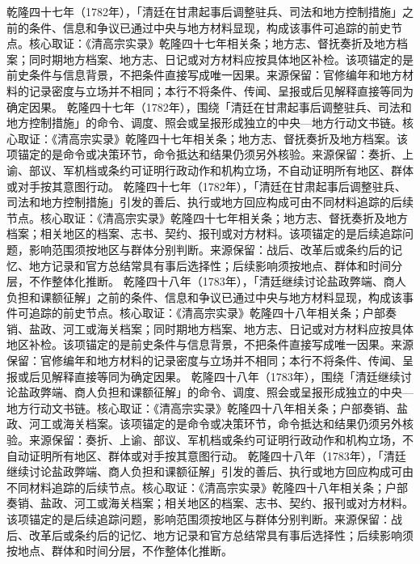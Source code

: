 乾隆四十七年（1782年），「清廷在甘肃起事后调整驻兵、司法和地方控制措施」之前的条件、信息和争议已通过中央与地方材料显现，构成该事件可追踪的前史节点。核心取证：《清高宗实录》乾隆四十七年相关条；地方志、督抚奏折及地方档案；同时期地方档案、地方志、日记或对方材料应按具体地区补检。该项锚定的是前史条件与信息背景，不把条件直接写成唯一因果。来源保留：官修编年和地方材料的记录密度与立场并不相同；本行不将条件、传闻、呈报或后见解释直接等同为确定因果。
乾隆四十七年（1782年），围绕「清廷在甘肃起事后调整驻兵、司法和地方控制措施」的命令、调度、照会或呈报形成独立的中央—地方行动文书链。核心取证：《清高宗实录》乾隆四十七年相关条；地方志、督抚奏折及地方档案。该项锚定的是命令或决策环节，命令抵达和结果仍须另外核验。来源保留：奏折、上谕、部议、军机档或条约可证明行政动作和机构立场，不自动证明所有地区、群体或对手按其意图行动。
乾隆四十七年（1782年），「清廷在甘肃起事后调整驻兵、司法和地方控制措施」引发的善后、执行或地方回应构成可由不同材料追踪的后续节点。核心取证：《清高宗实录》乾隆四十七年相关条；地方志、督抚奏折及地方档案；相关地区的档案、志书、契约、报刊或对方材料。该项锚定的是后续追踪问题，影响范围须按地区与群体分别判断。来源保留：战后、改革后或条约后的记忆、地方记录和官方总结常具有事后选择性；后续影响须按地点、群体和时间分层，不作整体化推断。
乾隆四十八年（1783年），「清廷继续讨论盐政弊端、商人负担和课额征解」之前的条件、信息和争议已通过中央与地方材料显现，构成该事件可追踪的前史节点。核心取证：《清高宗实录》乾隆四十八年相关条；户部奏销、盐政、河工或海关档案；同时期地方档案、地方志、日记或对方材料应按具体地区补检。该项锚定的是前史条件与信息背景，不把条件直接写成唯一因果。来源保留：官修编年和地方材料的记录密度与立场并不相同；本行不将条件、传闻、呈报或后见解释直接等同为确定因果。
乾隆四十八年（1783年），围绕「清廷继续讨论盐政弊端、商人负担和课额征解」的命令、调度、照会或呈报形成独立的中央—地方行动文书链。核心取证：《清高宗实录》乾隆四十八年相关条；户部奏销、盐政、河工或海关档案。该项锚定的是命令或决策环节，命令抵达和结果仍须另外核验。来源保留：奏折、上谕、部议、军机档或条约可证明行政动作和机构立场，不自动证明所有地区、群体或对手按其意图行动。
乾隆四十八年（1783年），「清廷继续讨论盐政弊端、商人负担和课额征解」引发的善后、执行或地方回应构成可由不同材料追踪的后续节点。核心取证：《清高宗实录》乾隆四十八年相关条；户部奏销、盐政、河工或海关档案；相关地区的档案、志书、契约、报刊或对方材料。该项锚定的是后续追踪问题，影响范围须按地区与群体分别判断。来源保留：战后、改革后或条约后的记忆、地方记录和官方总结常具有事后选择性；后续影响须按地点、群体和时间分层，不作整体化推断。
